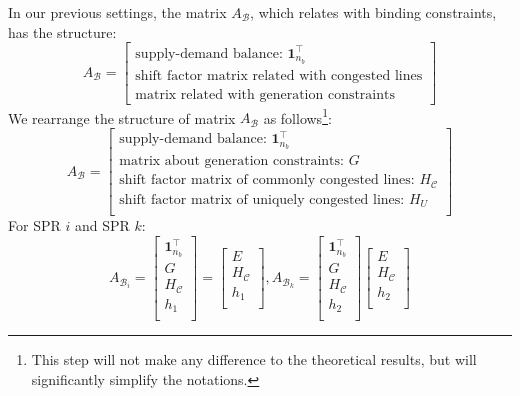 \documentclass[letterpaper, 11pt]{article}
\theoremstyle{plain}
\theoremstyle{definition}
\begin{document}
In our previous settings, the matrix $A_{\mathcal{B}}$, which relates with binding constraints, has the structure:
\begin{equation}
A_{\mathcal{B}} = 
  \begin{bmatrix}
    \text{supply-demand balance: } \mathbf{1}_{n_b}^\intercal  \\
    \text{shift factor matrix related with congested lines} \\
    \text{matrix related with generation constraints}
  \end{bmatrix}
\end{equation}
We rearrange the structure of matrix $A_{\mathcal{B}}$ as follows\footnote{This step will not make any difference to the theoretical results, but will significantly simplify the notations.}:
\begin{equation}
A_{\mathcal{B}} = 
  \begin{bmatrix}
    \text{supply-demand balance: } \mathbf{1}_{n_b}^\intercal  \\
    \text{matrix about generation constraints: }  G\\
    \text{shift factor matrix of commonly congested lines: } H_{\mathcal{C}} \\
    \text{shift factor matrix of uniquely congested lines: } H_U\\
  \end{bmatrix}
\end{equation}
For SPR $i$ and SPR $k$:
\begin{equation}
A_{\mathcal{B}_i} = 
  \begin{bmatrix}
    \mathbf{1}_{n_b}^\intercal \\
    G \\
    H_{\mathcal{C}} \\
    h_1 \\
  \end{bmatrix} 
  = \begin{bmatrix}
    E \\
    H_{\mathcal{C}} \\
    h_1 \\
  \end{bmatrix}, 
A_{\mathcal{B}_k} = 
  \begin{bmatrix}
    \mathbf{1}_{n_b}^\intercal \\
    G \\
    H_{\mathcal{C}} \\
    h_2 \\
  \end{bmatrix}
\begin{bmatrix}
    E \\
    H_{\mathcal{C}} \\
    h_2 \\
  \end{bmatrix} 
\end{equation}
\end{document}

